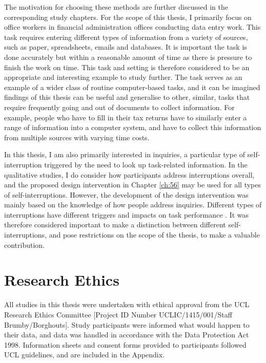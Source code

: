 The motivation for choosing these methods are further discussed in the corresponding study chapters. 
For the scope of this thesis, I primarily focus on office workers in financial administration offices conducting data entry work. This task requires entering different types of information from a variety of sources, such as paper, spreadsheets, emails and databases. It is important the task is done accurately but within a reasonable amount of time as there is pressure to finish the work on time. This task and setting is therefore considered to be an appropriate and interesting example to study further. The task serves as an example of a wider class of routine computer-based tasks, and it can be imagined findings of this thesis can be useful and generalise to other, similar, tasks that require frequently going and out of documents to collect information. For example, people who have to fill in their tax returns have to similarly enter a range of information into a computer system, and have to collect this information from multiple sources with varying time costs.

In this thesis, I am also primarily interested in inquiries, a particular type of self-interruption triggered by the need to look up task-related information. 
In the qualitative studies, I do consider how participants address interruptions overall, and the proposed design intervention in Chapter \ref{ch:56} may be used for all types of self-interruptions. However, the development of the design intervention was mainly based on the knowledge of how people address inquiries. Different types of interruptions have different triggers and impacts on task performance \citep{Jin2009}. It was therefore considered important to make a distinction between different self-interruptions, and pose restrictions on the scope of the thesis, to make a valuable contribution.

\section{Research Ethics}
All studies in this thesis were undertaken with ethical approval from the UCL Research Ethics Committee [Project ID Number UCLIC/1415/001/Staff Brumby/Borghouts]. Study participants were informed what would happen to their data, and data was handled in accordance with the Data Protection Act 1998. Information sheets and consent forms provided to participants followed UCL guidelines, and are included in the Appendix. 

